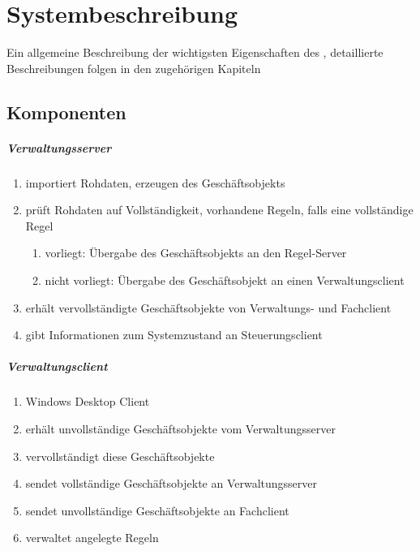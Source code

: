 \chapter{Systembeschreibung}
Ein allgemeine Beschreibung der wichtigsten Eigenschaften des \brand , detaillierte Beschreibungen folgen in den 
zugehörigen Kapiteln

%
\section{Komponenten}

\paragraph*{Verwaltungsserver}

\begin{enumerate}
\item importiert Rohdaten, erzeugen des Geschäftsobjekts
\item prüft Rohdaten auf Vollständigkeit, vorhandene Regeln, falls eine vollständige Regel 
\begin{enumerate}
\item vorliegt: Übergabe des Geschäftsobjekts an den Regel-Server
\item nicht vorliegt: Übergabe des Geschäftsobjekt an einen Verwaltungsclient
\end{enumerate}
\item erhält vervollständigte Geschäftsobjekte von Verwaltungs- und Fachclient
\item gibt Informationen zum Systemzustand an Steuerungsclient
\end{enumerate}

%
\paragraph*{Verwaltungsclient}

\begin{enumerate}
\item Windows Desktop Client
\item erhält unvollständige Geschäftsobjekte vom Verwaltungsserver
\item vervollständigt diese Geschäftsobjekte
\item sendet vollständige Geschäftsobjekte an Verwaltungsserver
\item sendet unvollständige Geschäftsobjekte an Fachclient
\item verwaltet angelegte Regeln
\end{enumerate}

